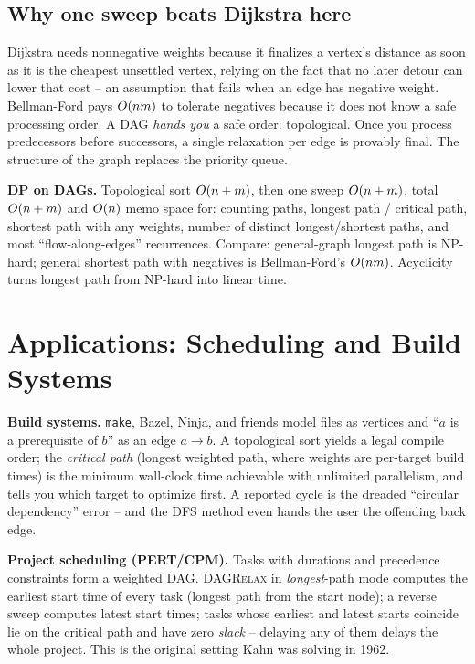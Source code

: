 \subsection{Why one sweep beats Dijkstra here}

\begin{intuitionbox}
Dijkstra needs nonnegative weights because it finalizes a vertex's distance as soon as it is the
cheapest unsettled vertex, relying on the fact that no later detour can lower that cost -- an assumption that fails when an edge has negative weight. Bellman-Ford pays $O(nm)$ to tolerate negatives because it does not know a safe
processing order. A DAG \emph{hands you} a safe order: topological. Once you process predecessors
before successors, a single relaxation per edge is provably final. The structure of the graph replaces
the priority queue.
\end{intuitionbox}

\begin{complexitybox}
\textbf{DP on DAGs.} Topological sort $O(n+m)$, then one sweep $O(n+m)$, total $O(n+m)$ and
$O(n)$ memo space for: counting paths, longest path / critical path, shortest path with any weights,
number of distinct longest/shortest paths, and most ``flow-along-edges'' recurrences. Compare:
general-graph longest path is NP-hard; general shortest path with negatives is Bellman-Ford's
$O(nm)$. Acyclicity turns longest path from NP-hard into linear time.
\end{complexitybox}

\section{Applications: Scheduling and Build Systems}

\begin{applicationbox}
\textbf{Build systems.} \texttt{make}, Bazel, Ninja, and friends model files as vertices and ``$a$ is
a prerequisite of $b$'' as an edge $a\to b$. A topological sort yields a legal compile order; the
\emph{critical path} (longest weighted path, where weights are per-target build times) is the minimum
wall-clock time achievable with unlimited parallelism, and tells you which target to optimize first.
A reported cycle is the dreaded ``circular dependency'' error -- and the DFS method even hands the
user the offending back edge.
\end{applicationbox}

\begin{applicationbox}
\textbf{Project scheduling (PERT/CPM).} Tasks with durations and precedence constraints form a
weighted DAG. \textsc{DAGRelax} in \emph{longest}-path mode computes the earliest start time of every
task (longest path from the start node); a reverse sweep computes latest start times; tasks whose
earliest and latest starts coincide lie on the critical path and have zero \emph{slack} -- delaying
any of them delays the whole project. This is the original setting Kahn was solving in 1962.
\end{applicationbox}

